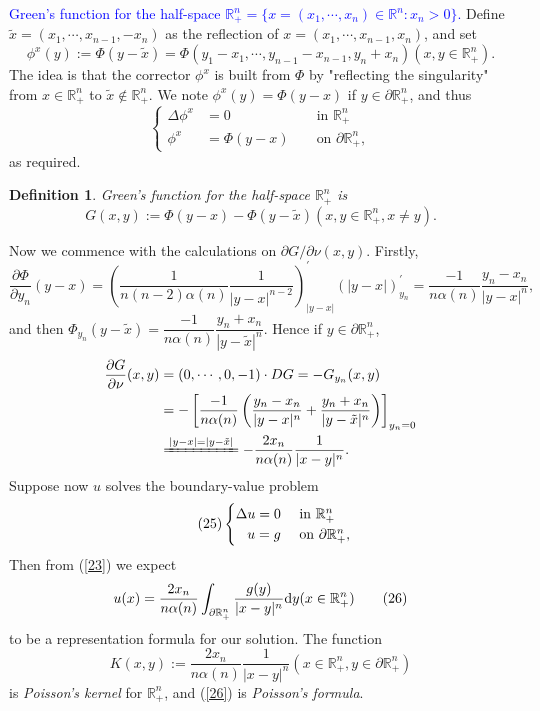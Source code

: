 \documentclass[hyperref,UTF8,12pt]{article}
\numberwithin{equation}{subsection}
\theoremstyle{plain}
\newtheorem{definition}{Definition}
\theoremstyle{definition}
\numberwithin{theorem}{section}
\numberwithin{lemma}{section}
\numberwithin{proposition}{section}
\numberwithin{remark}{section}
\numberwithin{corollary}{section}
\numberwithin{definition}{section}
\numberwithin{problem}{section}
\numberwithin{example}{section}
\def\dif{\textup{d}}
\newcommand{\ptl}{\partial}
\newcommand{\mr}{\mathbb{R}}
\begin{document}
\noindent\textcolor{blue}{Green's function for the half-space $\mr^n_+=\{x=(x_1,\cdots, x_n)\in\mr^n:x_n>0\}$.} Define $\tilde{x}=(x_1,\cdots,x_{n-1},-x_n)$ as the reflection of $x=(x_1,\cdots,x_{n-1},x_n)$, and set\[\phi^x(y):=\Phi(y-\tilde{x})=\Phi(y_1-x_1,\cdots, y_{n-1}-x_{n-1},y_n+x_n)(x,y\in\mr_+^n).\]The idea is that the corrector $\phi^x$ is built from $\Phi$ by "reflecting the singularity" from $x \in\mr_+^n$ to $\tilde{x}\notin\mr_+^n$. We note $\phi^x(y)=\Phi(y-x)$ if $y\in\ptl\mr_+^n$,
and thus\[\left\{\begin{aligned}
	\Delta\phi^x&=0 & & \text{ in }\mr_+^n\\
	\phi^x&=\Phi(y-x) & & \text{ on }\ptl\mr_+^n,
\end{aligned}\right.\]as required.
\begin{definition}
Green's function for the half-space $\mr_+^n$ is
\[G(x,y):=\Phi(y-x)-\Phi(y-\tilde{x}) (x,y\in\mr_+^n,x\neq y).\]
\end{definition}
Now we commence with the calculations on $\ptl G/\ptl\nu(x,y)$. Firstly,\[\frac{\ptl\Phi}
{\ptl y_n}(y-x)=\left(\frac{1}{n(n-2)\alpha(n)}\frac{1}{|y-x|^{n-2}}\right)^\prime_{|y-x|} (|y-x|)^\prime_{y_n}=\frac{-1}{n\alpha(n)}\frac{y_n-x_n}{|y-x|^n},\]and then $\Phi_{y_n}(y-\tilde{x})=\dfrac{-1}{n\alpha(n)}\dfrac{y_n+x_n}{|y-\tilde{x}|^n}$. Hence if $y\in\ptl\mr_+^n$,\[\begin{aligned}
	\frac{\ptl G}{\ptl\nu}(x,y)&=(0,\cdots,0,-1)\cdot DG=-G_{y_n}(x,y)\\
	&=-\left[\dfrac{-1}{n\alpha(n)}\left(\frac{y_n-x_n}{|y-x|^n}+\frac{y_n+x_n}{|y-\tilde{x}|^n}\right)\right]_{y_n=0}\\
	&\xlongequal{|y-x|=|y-\tilde{x}|}-\frac{2x_n}{n\alpha(n)}\frac{1}{|x-y|^n}.
\end{aligned}\]Suppose now $u$ solves the boundary-value problem\[\tag{25}\begin{cases}
\hfill\Delta u=0&\text{~in }\mr_+^n\\
\hfill u=g&\text{~on }\ptl\mr_+^n,
\end{cases}\label{25}\]Then from (\ref{23}) we expect
\[u(x)=\frac{2x_n}{n\alpha(n)}\int_{\ptl\mr_+^n}\frac{g(y)}{|x-y|^n}\dif y(x\in\mr_+ ^n)\tag{26}\label{26}\]to be a representation formula for our solution. The function
\[K(x,y):=\frac{2x_n}{n\alpha(n)}\frac{1}{|x-y|^n}(x\in\mr_+^n,y\in\ptl\mr_+^n)\]
is \emph{Poisson's kernel} for $\mr_+^n$, and (\ref{26}) is \emph{Poisson's formula}.
\end{document}
